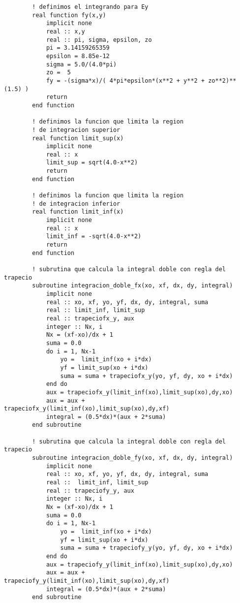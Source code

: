 \begin{lstlisting}
        ! definimos el integrando para Ey
        real function fy(x,y)
            implicit none
            real :: x,y
            real :: pi, sigma, epsilon, zo
            pi = 3.14159265359
            epsilon = 8.85e-12
            sigma = 5.0/(4.0*pi)
            zo =  5
            fy = -(sigma*x)/( 4*pi*epsilon*(x**2 + y**2 + zo**2)**(1.5) )
            return
        end function

        ! definimos la funcion que limita la region
        ! de integracion superior 
        real function limit_sup(x)
            implicit none
            real :: x
            limit_sup = sqrt(4.0-x**2)
            return
        end function

        ! definimos la funcion que limita la region
        ! de integracion inferior 
        real function limit_inf(x)
            implicit none
            real :: x
            limit_inf = -sqrt(4.0-x**2)
            return
        end function

        ! subrutina que calcula la integral doble con regla del trapecio
        subroutine integracion_doble_fx(xo, xf, dx, dy, integral)
            implicit none
            real :: xo, xf, yo, yf, dx, dy, integral, suma
            real :: limit_inf, limit_sup
            real :: trapeciofx_y, aux
            integer :: Nx, i
            Nx = (xf-xo)/dx + 1
            suma = 0.0
            do i = 1, Nx-1
                yo =  limit_inf(xo + i*dx)
                yf = limit_sup(xo + i*dx)
                suma = suma + trapeciofx_y(yo, yf, dy, xo + i*dx)
            end do
            aux = trapeciofx_y(limit_inf(xo),limit_sup(xo),dy,xo) 
            aux = aux + trapeciofx_y(limit_inf(xo),limit_sup(xo),dy,xf)
            integral = (0.5*dx)*(aux + 2*suma)
        end subroutine

        ! subrutina que calcula la integral doble con regla del trapecio
        subroutine integracion_doble_fy(xo, xf, dx, dy, integral)
            implicit none
            real :: xo, xf, yo, yf, dx, dy, integral, suma
            real ::  limit_inf, limit_sup
            real :: trapeciofy_y, aux
            integer :: Nx, i
            Nx = (xf-xo)/dx + 1
            suma = 0.0
            do i = 1, Nx-1
                yo =  limit_inf(xo + i*dx)
                yf = limit_sup(xo + i*dx)
                suma = suma + trapeciofy_y(yo, yf, dy, xo + i*dx)
            end do
            aux = trapeciofy_y(limit_inf(xo),limit_sup(xo),dy,xo) 
            aux = aux + trapeciofy_y(limit_inf(xo),limit_sup(xo),dy,xf)
            integral = (0.5*dx)*(aux + 2*suma)
        end subroutine


\end{lstlisting}
